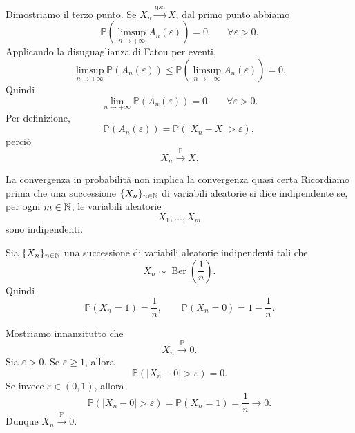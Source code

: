 \documentclass[a4paper]{article}
\begin{document}
\begin{snippetproof}{}
    Dimostriamo il terzo punto. Se \(X_n\xrightarrow{\text{q.c.}}X\), dal primo punto abbiamo
    \[
        \mathbb{P}\left(\limsup_{n\to+\infty}A_n(\varepsilon)\right)=0
        \qquad
        \forall \varepsilon>0.
    \]
    Applicando la disuguaglianza di Fatou per eventi,
    \[
        \limsup_{n\to+\infty}\mathbb{P}(A_n(\varepsilon))
        \leq
        \mathbb{P}\left(\limsup_{n\to+\infty}A_n(\varepsilon)\right)=0.
    \]
    Quindi
    \[
        \lim_{n\to+\infty}\mathbb{P}(A_n(\varepsilon))=0
        \qquad
        \forall \varepsilon>0.
    \]
    Per definizione,
    \[
        \mathbb{P}(A_n(\varepsilon))
        =
        \mathbb{P}(|X_n-X|>\varepsilon),
    \]
    perciò
    \[
        X_n\xrightarrow{\mathbb{P}}X.
    \]
\end{snippetproof}

\begin{snippetexample}{La convergenza in probabilità non implica la convergenza quasi certa}
    Ricordiamo prima che una successione \(\{X_n\}_{n\in\mathbb{N}}\) di variabili aleatorie si dice indipendente se, per ogni \(m\in\mathbb{N}\), le variabili aleatorie
    \[
        X_1,\ldots,X_m
    \]
    sono indipendenti.

    Sia \(\{X_n\}_{n\in\mathbb{N}}\) una successione di variabili aleatorie indipendenti tali che
    \[
        X_n\sim\operatorname{Ber}\left(\frac1n\right).
    \]
    Quindi
    \[
        \mathbb{P}(X_n=1)=\frac1n,
        \qquad
        \mathbb{P}(X_n=0)=1-\frac1n.
    \]

    Mostriamo innanzitutto che
    \[
        X_n\xrightarrow{\mathbb{P}}0.
    \]
    Sia \(\varepsilon>0\). Se \(\varepsilon\geq 1\), allora
    \[
        \mathbb{P}(|X_n-0|>\varepsilon)=0.
    \]
    Se invece \(\varepsilon\in(0,1)\), allora
    \[
        \mathbb{P}(|X_n-0|>\varepsilon)
        =
        \mathbb{P}(X_n=1)
        =
        \frac1n
        \longrightarrow 0.
    \]
    Dunque \(X_n\xrightarrow{\mathbb{P}}0\).


\end{snippetexample}
\end{document}
